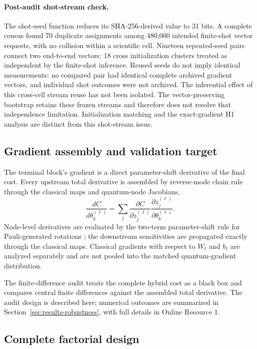 \documentclass[pdflatex,sn-mathphys-num,Numbered]{sn-jnl}
\begin{document}
\paragraph{Post-audit shot-stream check.}\label{sec:shot-stream-audit}
The shot-seed function reduces its SHA-256-derived value to 31 bits. A complete census found 70 duplicate assignments among 480,000 intended finite-shot vector requests, with no collision within a scientific cell. Nineteen repeated-seed pairs connect two end-to-end vectors; 18 cross initialization clusters treated as independent by the finite-shot inference. Reused seeds do not imply identical measurements: no compared pair had identical complete archived gradient vectors, and individual shot outcomes were not archived. The inferential effect of this cross-cell stream reuse has not been isolated. The vector-preserving bootstrap retains these frozen streams and therefore does not resolve that independence limitation. Initialization matching and the exact-gradient H1 analysis are distinct from this shot-stream issue.

\subsection{Gradient assembly and validation target}

The terminal block's gradient is a direct parameter-shift derivative of the final cost. Every upstream total derivative is assembled by reverse-mode chain rule through the classical maps and quantum-node Jacobians,
\[
\frac{dC}{d\theta_k^{(\ell)}}
=\sum_j
\frac{\partial C}{\partial z_j^{(\ell)}}
\frac{\partial z_j^{(\ell)}}{\partial\theta_k^{(\ell)}}.
\]
Node-level derivatives are evaluated by the two-term parameter-shift rule for Pauli-generated rotations \cite{mitarai2018quantum,schuld2019evaluating}; the downstream sensitivities are propagated exactly through the classical maps. Classical gradients with respect to $W_\ell$ and $b_\ell$ are analyzed separately and are not pooled into the matched quantum-gradient distribution.

The finite-difference audit treats the complete hybrid cost as a black box and compares central finite differences against the assembled total derivative. The audit design is described here; numerical outcomes are summarized in Section~\ref{sec:results-robustness}, with full details in Online Resource 1.

\subsection{Complete factorial design}
\end{document}
